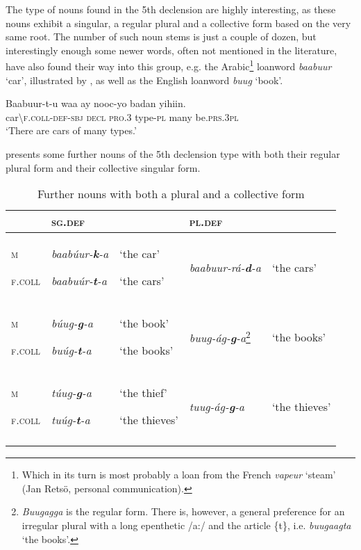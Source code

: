 \documentclass[output=paper]{langsci/langscibook}
\begin{document}
The type of nouns found in the 5th declension are highly interesting, as these nouns exhibit a singular, a regular plural and a collective form based on the very same root. The number of such noun stems is just a couple of dozen, but interestingly enough some newer words, often not mentioned in the literature, have also found their way into this group, e.g. the Arabic\footnote{Which in its turn is most probably a loan from the French \textit{vapeur} ‘steam’ (Jan Retsö, personal communication).} loanword \textit{baabuur} ‘car’, illustrated by , as well as the English loanword \textit{buug} ‘book’.

\ea\label{ex:nilsson:7}
\gll Baabuur-t-u     waa    ay    nooc-yo  badan   yihiin.\\
     car{\textbackslash}\textsc{f.coll-def-sbj}  \textsc{decl}   \textsc{pro.3}  type-\textsc{pl}  many   be.\textsc{prs.3pl}\\
\glt ‘There are cars of many types.’
\z

 presents some further nouns of the 5th declension type with both their regular plural form and their collective singular form.
 
\begin{table}
\caption{Further nouns with both a plural and a collective form}
\label{tab:nilsson:10}
\begin{tabularx}{\textwidth}{XXXlX} 
\lsptoprule
& {\textsc{sg.def}} &  & {\textsc{pl.def}} & \\
\midrule
{\textsc{m}}

{\textsc{f.coll}} & {\textit{baabúur-}\textbf{\textit{k}}\textit{-a}}

{\textit{baabuúr-}\textbf{\textit{t}}\textit{-a}} & {‘the car’}

{‘the cars’} & {\textit{baabuur-rá-}\textbf{\textit{d}}\textit{-a}} & {‘the cars’}\\
\tablevspace
{\textsc{m}}

{\textsc{f.coll}} & {\textit{búug-}\textbf{\textit{g}}\textit{-a}}

{\textit{buúg-}\textbf{\textit{t}}\textit{-a}} & {‘the book’}

{‘the books’} & {\textit{buug-ág-}\textbf{\textit{g}}\textit{-a}}\footnote{\textit{Buugagga} is the regular form. There is, however, a general preference for an irregular plural with a long epenthetic /a:/ and the article \{t\}, i.e. \textit{buugaagta} ‘the books’.} & {‘the books’}\\
\tablevspace
{\textsc{m}}

{\textsc{f.coll}} & {\textit{túug-}\textbf{\textit{g}}\textit{-a}}

{\textit{tuúg-}\textbf{\textit{t}}\textit{-a}} & {‘the thief’}

{‘the thieves’} & {\textit{tuug-ág-}\textbf{\textit{g}}\textit{-a}} & {‘the thieves’}\\
\lspbottomrule
\end{tabularx}
 
\end{table} 
\end{document}
